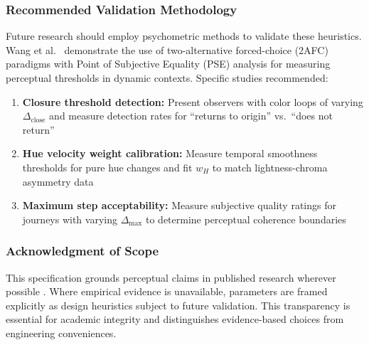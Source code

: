 \subsubsection{Recommended Validation Methodology}

Future research should employ psychometric methods to validate these heuristics. Wang et al.\ \citeyearpar{wang2022} demonstrate the use of two-alternative forced-choice (2AFC) paradigms with Point of Subjective Equality (PSE) analysis for measuring perceptual thresholds in dynamic contexts. Specific studies recommended:

\begin{enumerate}
    \item \textbf{Closure threshold detection:} Present observers with color loops of varying $\Delta_{\text{close}}$ and measure detection rates for ``returns to origin'' vs.\ ``does not return''
    \item \textbf{Hue velocity weight calibration:} Measure temporal smoothness thresholds for pure hue changes and fit $w_H$ to match lightness-chroma asymmetry data
    \item \textbf{Maximum step acceptability:} Measure subjective quality ratings for journeys with varying $\Delta_{\max}$ to determine perceptual coherence boundaries
\end{enumerate}

\subsubsection{Acknowledgment of Scope}

This specification grounds perceptual claims in published research wherever possible \citep{hong2024,sekulovski2007,braun2017,nolle2012}. Where empirical evidence is unavailable, parameters are framed explicitly as design heuristics subject to future validation. This transparency is essential for academic integrity and distinguishes evidence-based choices from engineering conveniences.

